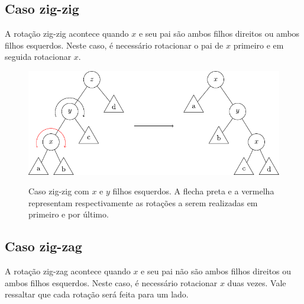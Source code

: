 \subsection{Caso zig-zig}

A rotação zig-zig acontece quando $x$ e seu pai são ambos filhos direitos ou ambos filhos esquerdos. Neste caso, é necessário rotacionar o pai de $x$ primeiro e em seguida rotacionar $x$.

\begin{figure}[h]
    \centering
    \includegraphics{images/zigzig.pdf}
    \label{fig:zigzig}

\caption{Caso zig-zig com $x$ e $y$ filhos esquerdos. A flecha preta e a vermelha representam respectivamente as rotações a serem realizadas em primeiro e por último.}
\end{figure}

\subsection{Caso zig-zag}

A rotação zig-zag acontece quando $x$ e seu pai não são ambos filhos direitos ou ambos filhos esquerdos. Neste caso, é necessário rotacionar $x$ duas vezes. Vale ressaltar que cada rotação será feita para um lado.



